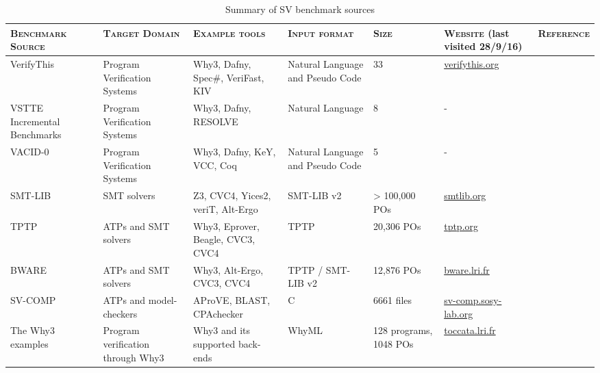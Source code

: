 \begin{table}
	\caption[Summary of SV benchmark sources]{Summary of SV benchmark sources}
	\begin{adjustbox}{angle=90}  
	\begin{tabularx}{0.9\textheight}{@{}Y|Y|Y|Y|Y|Y|c@{}}
		\textsc{\textbf{Benchmark Source}} & \textsc{\textbf{Target Domain}} &  \textsc{\textbf{Example tools}} & \textsc{\textbf{Input format}} & \textsc{\textbf{Size}} & \textsc{\textbf{Website}} \linebreak \small{(last visited 28/9/16)} & \textsc{\textbf{Reference}} \\
		\midrule
		VerifyThis & Program Verification Systems & \textsf{Why3}, Dafny, Spec\#, VeriFast, KIV & Natural Language and Pseudo Code & 33 & \href{http://www.verifythis.org/challenge-db}{verifythis.org} & \cite{Huisman2015} \\ 
		\midrule
		VSTTE Incremental Benchmarks & Program Verification Systems & \textsf{Why3}, Dafny, RESOLVE & Natural Language & 8 & - & \cite{Weide2008} \\ 
		\midrule
		VACID-0 & Program Verification Systems & \textsf{Why3}, Dafny, KeY, VCC, Coq & Natural Language and Pseudo Code & 5 & - & \cite{Leino10vacid-0:verification} \\
		\midrule
		SMT-LIB & SMT solvers & Z3, CVC4, Yices2, veriT, Alt-Ergo & SMT-LIB v2 & > 100,000 POs & \href{http://smtlib.cs.uiowa.edu/benchmarks.shtml}{smtlib.org} & \cite{BarFT-SMTLIB} \\
		\midrule
		TPTP & ATPs and SMT solvers & \textsf{Why3}, Eprover, Beagle, CVC3, CVC4 & TPTP & 20,306 POs & \href{http://www.cs.miami.edu/~tptp}{tptp.org} & \cite{SS98} \\
		\midrule
		BWARE & ATPs and SMT solvers & \textsf{Why3}, Alt-Ergo, CVC3, CVC4 & TPTP / SMT-LIB v2 & 12,876 POs & \href{http://bware.lri.fr/index.php/Benchmarks}{bware.lri.fr} & \cite{Delahaye2014} \\
		\midrule
		SV-COMP & ATPs and model-checkers & AProVE, BLAST, CPAchecker & C & 6661 files & \href{http://sv-comp.sosy-lab.org}{sv-comp.sosy-lab.org} & \cite{SVCOMP} \\   
		\midrule
		The \textsf{Why3} examples & Program verification through \textsf{Why3} & \textsf{Why3} and its supported back-ends & WhyML & 128 programs, 1048 POs & \href{http://tocatta.lri.fr/gallery/why3.en.html}{toccata.lri.fr} & \cite{verifythis, tafat:inria-00636083} \\
		
	\end{tabularx}
	\end{adjustbox}
	\label{table:benchmarks}
\end{table}


